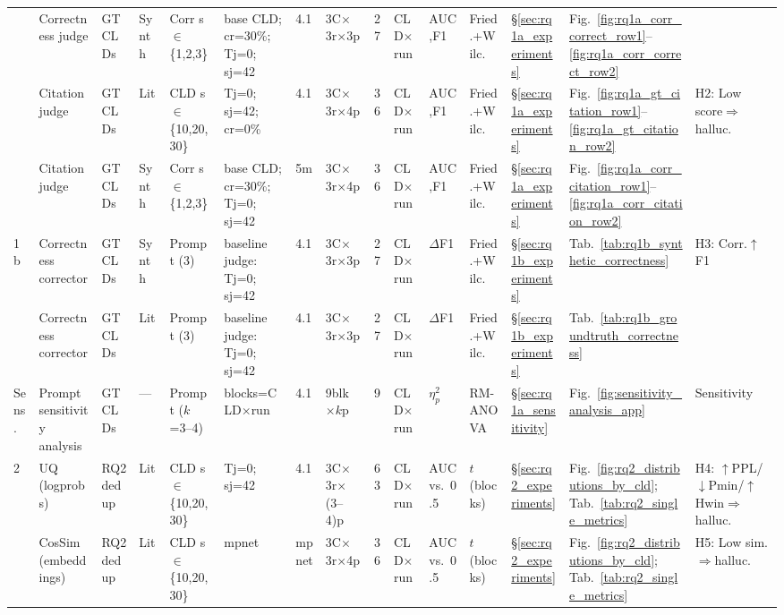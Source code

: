\begin{landscape}
\begin{table}[H]
{\begin{tabular}{@{}l l l l l l l l c l l l l l l@{}}
  & Correctness judge & GT CLDs & Synth & Corr s$\in$\{1,2,3\} & base CLD; cr=30\%; Tj=0; sj=42 & 4.1 & 3C$\times$3r$\times$3p & 27 & CLD$\times$run & AUC,F1 & Fried.+Wilc. & \S\ref{sec:rq1a_experiments} & Fig.~\ref{fig:rq1a_corr_correct_row1}--\ref{fig:rq1a_corr_correct_row2} & \\
  & Citation judge & GT CLDs & Lit & CLD s$\in$\{10,20,30\} & Tj=0; sj=42; cr=0\% & 4.1 & 3C$\times$3r$\times$4p & 36 & CLD$\times$run & AUC,F1 & Fried.+Wilc. & \S\ref{sec:rq1a_experiments} & Fig.~\ref{fig:rq1a_gt_citation_row1}--\ref{fig:rq1a_gt_citation_row2} & \multirow{2}{*}{H2: Low score$\Rightarrow$halluc.} \\
  & Citation judge & GT CLDs & Synth & Corr s$\in$\{1,2,3\} & base CLD; cr=30\%; Tj=0; sj=42 & 5m & 3C$\times$3r$\times$4p & 36 & CLD$\times$run & AUC,F1 & Fried.+Wilc. & \S\ref{sec:rq1a_experiments} & Fig.~\ref{fig:rq1a_corr_citation_row1}--\ref{fig:rq1a_corr_citation_row2} & \\
\midrule
\multirow{2}{*}{1b}
  & Correctness corrector & GT CLDs & Synth & Prompt (3) & baseline judge: Tj=0; sj=42 & 4.1 & 3C$\times$3r$\times$3p & 27 & CLD$\times$run & $\Delta$F1 & Fried.+Wilc. & \S\ref{sec:rq1b_experiments} & Tab.~\ref{tab:rq1b_synthetic_correctness} & \multirow{2}{*}{H3: Corr.$\uparrow$F1} \\
  & Correctness corrector & GT CLDs & Lit & Prompt (3) & baseline judge: Tj=0; sj=42 & 4.1 & 3C$\times$3r$\times$3p & 27 & CLD$\times$run & $\Delta$F1 & Fried.+Wilc. & \S\ref{sec:rq1b_experiments} & Tab.~\ref{tab:rq1b_groundtruth_correctness} & \\
\midrule
Sens. & Prompt sensitivity analysis & GT CLDs & --- & Prompt ($k$=3--4) & blocks=CLD$\times$run & 4.1 & 9blk$\times k$p & 9 & CLD$\times$run & $\eta^2_p$ & RM-ANOVA & \S\ref{sec:rq1a_sensitivity} & Fig.~\ref{fig:sensitivity_analysis_app} & Sensitivity \\
\midrule
\multirow{2}{*}{2}
  & UQ (logprobs) & RQ2 dedup & Lit & CLD s$\in$\{10,20,30\} & Tj=0; sj=42 & 4.1 & 3C$\times$3r$\times$(3--4)p & 63 & CLD$\times$run & AUC vs.\ 0.5 & $t$ (blocks) & \S\ref{sec:rq2_experiments} & Fig.~\ref{fig:rq2_distributions_by_cld}; Tab.~\ref{tab:rq2_single_metrics} & H4: $\uparrow$PPL/$\downarrow$Pmin/$\uparrow$Hwin$\Rightarrow$halluc. \\
  & CosSim (embeddings) & RQ2 dedup & Lit & CLD s$\in$\{10,20,30\} & mpnet & mpnet & 3C$\times$3r$\times$4p & 36 & CLD$\times$run & AUC vs.\ 0.5 & $t$ (blocks) & \S\ref{sec:rq2_experiments} & Fig.~\ref{fig:rq2_distributions_by_cld}; Tab.~\ref{tab:rq2_single_metrics} & H5: Low sim.$\Rightarrow$halluc. \\

\end{tabular}}
\end{table}
\end{landscape}
